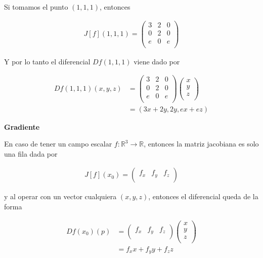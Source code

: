 \documentclass{article}
\theoremstyle{plain}
\theoremstyle{definition}
\begin{document}
Si tomamos el punto $(1,1,1)$, entonces

\begin{align*}
    J[f](1,1,1) = \begin{pmatrix}
        3 & 2 & 0 \\
        0 & 2 & 0 \\
        e & 0 & e \\
    \end{pmatrix}
\end{align*}



Y por lo tanto el diferencial $Df(1,1,1)$ viene dado por

\begin{align*}
    Df(1,1,1)(x,y,z) &= \begin{pmatrix}
        3 & 2 & 0 \\
        0 & 2 & 0 \\
        e & 0 & e \\
    \end{pmatrix}\begin{pmatrix}
        x \\
        y \\
        z \\
    \end{pmatrix} \\
    &= (3x+2y, 2y,ex+ez )
\end{align*}


\newpage

\begin{center}
    \Large{\textbf{Gradiente}}
\end{center}

En caso de tener un campo escalar $f: \mathbb{R}^3 \to \mathbb{R}$, entonces la matriz jacobiana es solo una fila dada por


\begin{align*}
    J[f](x_0) = \begin{pmatrix}
        {f}_x & {f}_y & {f}_z \\
    \end{pmatrix}
\end{align*}

y al operar con un vector cualquiera $(x,y,z)$, entonces el diferencial queda de la forma

\begin{align*}
    Df(x_0)(p) &= \begin{pmatrix}
        {f}_x & {f}_y & {f}_z \\
    \end{pmatrix} \begin{pmatrix}
        x \\
        y \\
        z \\
    \end{pmatrix} \\
    &= f_x x + f_y y +f_z z
\end{align*}
\end{document}
